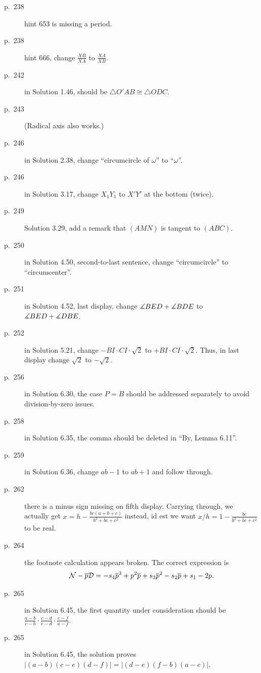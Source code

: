 \documentclass[11pt]{scrartcl}
\begin{document}
\begin{description}
\item[p.\  238] hint 653 is missing a period.
\item[p.\  238] hint 666, change $\frac{XB}{XA}$ to $\frac{XA}{XB}$.
\item[p.\  242] in Solution 1.46, should be $\triangle O'AB \cong \triangle ODC$.
\item[p.\  243] 
  (Radical axis also works.)
\item[p.\  246] in Solution 2.38, change ``circumcircle of $\omega$'' to ``$\omega$''.
\item[p.\  246] in Solution 3.17, change $X_1Y_1$ to $X'Y'$ at the bottom (twice).
\item[p.\  249] Solution 3.29, add a remark that $(AMN)$ is tangent to $(ABC)$.
\item[p.\  250] in Solution 4.50, second-to-last sentence,
  change ``circumcircle'' to ``circumcenter''.
\item[p.\  251] in Solution 4.52, last display,
  change $\measuredangle BED + \measuredangle BDE$ to $\measuredangle BED + \measuredangle DBE$.
\item[p.\  252] in Solution 5.21, change $-BI \cdot CI \cdot \sqrt2$ to $+ BI \cdot CI \cdot \sqrt2$.
  Thus, in last display change $\sqrt2$ to $-\sqrt2$.
\item[p.\  256] in Solution 6.30, the case $P=B$ should be addressed separately
  to avoid division-by-zero issues.
\item[p.\  258] in Solution 6.35, the comma should be deleted in ``By, Lemma 6.11''.
\item[p.\  259] in Solution 6.36, change $ab-1$ to $ab+1$ and follow through.
\item[p.\  262] there is a minus sign missing on fifth display.
  Carrying through, we actually get $x = h - \frac{bc(a+b+c)}{b^2+bc+c^2}$ instead,
  id est we want $x/h = 1 - \frac{bc}{b^2+bc+c^2}$ to be real.
\item[p.\  264] the footnote calculation appears broken. The correct expression is
  \[ \mathcal{N} - \overline p \mathcal{D}
    = -s_4 \overline p^3 + p^2 \overline p + s_3 \overline p^2 - s_2 \overline p + s_1 - 2 p.  \]
\item[p.\  265] in Solution 6.45, the first quantity under consideration should be
  $\frac{a-b}{c-b}\cdot\frac{c-d}{e-d}\cdot\frac{e-f}{a-f}$.
\item[p.\  265] in Solution 6.45, the solution proves $|(a-b)(c-e)(d-f)|=|(d-e)(f-b)(a-c)|$.

\end{description}
\end{document}
